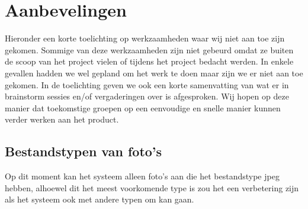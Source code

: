 \section{Aanbevelingen}
\label{Aanbevelingen}
Hieronder een korte toelichting op werkzaamheden waar wij niet aan toe zijn gekomen. Sommige van deze werkzaamheden zijn niet gebeurd omdat ze buiten de scoop van het project vielen of tijdens het project bedacht werden. In enkele gevallen hadden we wel gepland om het werk te doen maar zijn we er niet aan toe gekomen.  In de toelichting geven we ook een korte samenvatting van wat er in brainstorm sessies en/of vergaderingen over is afgesproken. Wij hopen op deze manier dat toekomstige groepen op een eenvoudige en snelle manier kunnen verder werken aan het product.

\subsection{Bestandstypen van foto's}
Op dit moment kan het systeem alleen foto's aan die het bestandstype jpeg hebben, alhoewel dit het meest voorkomende type is zou het een verbetering zijn als het systeem ook met andere typen om kan gaan.
